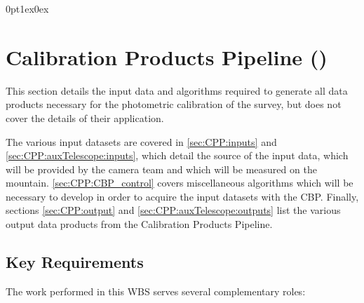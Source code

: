 \titlespacing*{\subsubsection}
{0pt}{1ex}{0ex}


\section{Calibration Products Pipeline (\wbsCPP)}
\label{sec:cpp}

This section details the input data and algorithms required to generate all data products necessary for the photometric calibration of the survey, but does not cover the details of their application.

The various input datasets are covered in \secsymbol\ref{sec:CPP:inputs} and \secsymbol\ref{sec:CPP:auxTelescope:inputs}, which detail the source of the input data, \ie which will be provided by the camera team and which will be measured on the mountain. \secsymbol\ref{sec:CPP:CBP_control} covers miscellaneous algorithms which will be necessary to develop in order to acquire the input datasets with the CBP. Finally, sections \secsymbol\ref{sec:CPP:output} and \secsymbol\ref{sec:CPP:auxTelescope:outputs} list the various output data products from the Calibration Products Pipeline.

\subsection{Key Requirements}
\label{sec:CPP:keyRequirements}
The work performed in this WBS serves several complementary roles:

